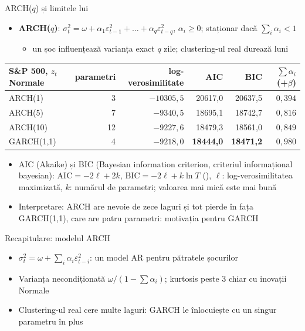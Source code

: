 \begin{frame}{ARCH($q$) și limitele lui}
\itemsize{\footnotesize}
\begin{itemize}
    \item \textbf{ARCH($q$)}: $\sigma_t^2 = \omega + \alpha_1\varepsilon_{t-1}^2 + \dots + \alpha_q\varepsilon_{t-q}^2$, $\alpha_i \ge 0$; staționar dacă $\sum_i \alpha_i < 1$
    \begin{itemize}
        \item un șoc influențează varianța exact $q$ zile; clustering-ul real durează luni
    \end{itemize}
\end{itemize}\begin{center}
\footnotesize
\begin{tabular}{lrrrrr}
\toprule
S\&P 500, $z_t$ Normale & parametri & log-verosimilitate & AIC & BIC & $\sum\alpha_i$ (+$\beta$) \\
\midrule
ARCH(1) & 3 & $\ensuremath{-}10305{,}5$ & 20617{,}0 & 20637{,}5 & $0{,}394$ \\
ARCH(5) & 7 & $\ensuremath{-}9340{,}5$ & 18695{,}1 & 18742{,}7 & $0{,}816$ \\
ARCH(10) & 12 & $\ensuremath{-}9227{,}6$ & 18479{,}3 & 18561{,}0 & $0{,}849$ \\
GARCH(1,1) & 4 & $\ensuremath{-}9218{,}0$ & \textbf{18444{,}0} & \textbf{18471{,}2} & $0{,}980$ \\
\bottomrule
\end{tabular}
\end{center}
\begin{itemize}
    \item \hypertarget{ch5-aicbic}{}AIC (Akaike) și BIC (Bayesian information criterion, criteriul informațional bayesian): $\mathrm{AIC} = -2\ell + 2k$, $\mathrm{BIC} = -2\ell + k\ln T$ (), $\ell$: log-verosimilitatea maximizată, $k$: numărul de parametri; valoarea mai mică este mai bună
    \item Interpretare: ARCH are nevoie de zece laguri și tot pierde în fața GARCH(1,1), care are patru parametri: motivația pentru GARCH
\end{itemize}
\end{frame}

\begin{frame}{Recapitulare: modelul ARCH}
\itemsize{\small}
\begin{itemize}
    \item $\sigma_t^2 = \omega + \sum_i\alpha_i\varepsilon_{t-i}^2$: un model AR pentru pătratele șocurilor
    \item Varianța necondiționată $\omega/(1 - \sum\alpha_i)$; kurtosis peste 3 chiar cu inovații Normale
    \item Clustering-ul real cere multe laguri: GARCH le înlocuiește cu un singur parametru în plus
\end{itemize}
\end{frame}


